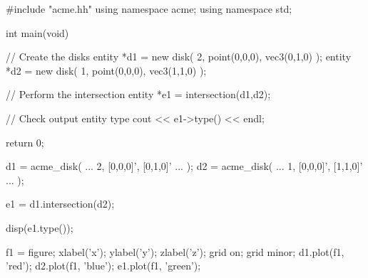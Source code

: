 \begin{minipage}[t]{0.475\textwidth}
\cpp{}
\begin{mapleboxed}
#include "acme.hh"
using namespace acme;
using namespace std;

int main(void){
  // Create the disks
  entity *d1 = new disk(
    2, point(0,0,0), vec3(0,1,0)
  );
  entity *d2 = new disk(
    1, point(0,0,0), vec3(1,1,0)
  );

  // Perform the intersection
  entity *e1 = intersection(d1,d2);

  // Check output entity type
  cout << e1->type() << endl;

  return 0;
}
\end{mapleboxed}
\end{minipage}
\hfill
\begin{minipage}[t]{0.475\textwidth}
\Matlab{}
\begin{mapleboxed}
d1 = acme_disk( ...
  2, [0,0,0]', [0,1,0]' ...
);
d2 = acme_disk( ...
  1, [0,0,0]', [1,1,0]' ...
);

e1 = d1.intersection(d2);

disp(e1.type());

f1 = figure;
xlabel('x'); ylabel('y'); zlabel('z');
grid on; grid minor;
d1.plot(f1, 'red');
d2.plot(f1, 'blue');
e1.plot(f1, 'green');
\end{mapleboxed}
\end{minipage}

